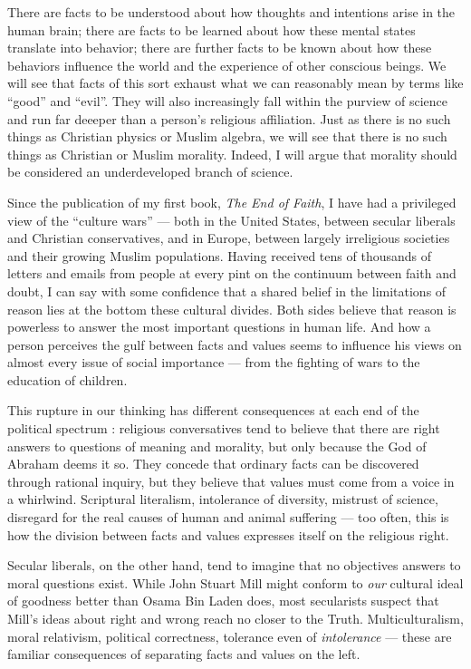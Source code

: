 \documentclass[a4paper,12pt]{extbook}
\begin{document}
There are facts to be understood about how thoughts and intentions arise in the human brain;
there are facts to be learned about how these mental states translate into behavior;
there are further facts to be known about how these behaviors influence the world and the experience of other conscious beings.
We will see that facts of this sort exhaust what we can reasonably mean by terms like ``good'' and ``evil''.
They will also increasingly fall within the purview of science and run far deeeper than a person's religious affiliation.
Just as there is no such things as Christian physics or Muslim algebra, we will see that there is no such things as Christian or Muslim morality.
Indeed, I will argue that morality should be considered an underdeveloped branch of science.

Since the publication of my first book, \textit{The End of Faith}, I have had a privileged view of the ``culture wars'' --- both in the United States, between secular liberals and Christian conservatives, and in Europe, between largely irreligious societies and their growing Muslim populations.
Having received tens of thousands of letters and emails from people at every pint on the continuum between faith and doubt, I can say with some confidence that a shared belief in the limitations of reason lies at the bottom these cultural divides.
Both sides believe that reason is powerless to answer the most important questions in human life.
And how a person perceives the gulf between facts and values seems to influence his views on almost every issue of social importance --- from the fighting of wars to the education of children.

This rupture in our thinking has different consequences at each end of the political spectrum :
religious conversatives tend to believe that there are right answers to questions of meaning and morality, but only because the God of Abraham deems it so.
They concede that ordinary facts can be discovered through rational inquiry, but they believe that values must come from a voice in a whirlwind.
Scriptural literalism, intolerance of diversity, mistrust of science, disregard for the real causes of human and animal suffering --- too often, this is how the division between facts and values expresses itself on the religious right.

Secular liberals, on the other hand, tend to imagine that no objectives answers to moral questions exist.
While John Stuart Mill might conform to \textit{our} cultural ideal of goodness better than Osama Bin Laden does, most secularists suspect that Mill's ideas about right and wrong reach no closer to the Truth.
Multiculturalism, moral relativism, political correctness, tolerance even of \textit{intolerance} --- these are familiar consequences of separating facts and values on the left.
\end{document}
